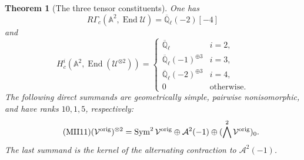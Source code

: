 \documentclass[11pt]{article}
\newtheorem{theorem}{Theorem}
\renewcommand{\AA}{\mathbb A}
\newcommand{\QQl}{\overline{\mathbb Q}_\ell}
\newcommand{\End}{\operatorname{End}}
\newcommand{\Sym}{\operatorname{Sym}}
\begin{document}
\begin{theorem}[The three tensor constituents]\label{mii:tensor}
One has
\begin{equation}\tag{MII9}\label{mii:endU}
 R\Gamma_c(\AA^2,\End\mathcal U)=\QQl(-2)[-4]
\end{equation}
and
\begin{equation}\tag{MII10}\label{mii:endtensor}
 H_c^i(\AA^2,\End(\mathcal U^{\otimes2}))=
 \begin{cases}
 \QQl&i=2,\\
 \QQl(-1)^{\oplus3}&i=3,\\
 \QQl(-2)^{\oplus3}&i=4,\\
 0&\text{otherwise}.
 \end{cases}
\end{equation}
The following direct summands are geometrically simple, pairwise
nonisomorphic, and have ranks $10,1,5$, respectively:
\begin{equation}\tag{MII11}\label{mii:decomposition}
 (\mathcal V^{\rm orig})^{\otimes2}
 =\Sym^2\mathcal V^{\rm orig}
 \oplus\mathcal A^2(-1)
 \oplus(\bigwedge^2\mathcal V^{\rm orig})_0.
\end{equation}
The last summand is the kernel of the alternating contraction to
$\mathcal A^2(-1)$.
\end{theorem}
\end{document}
